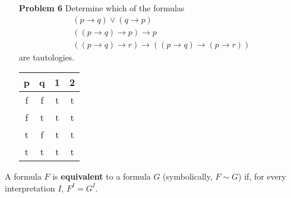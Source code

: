 \begin{enumerate}
\item[\textbf{Problem 6}] Determine which of the formulas 
\begin{gather*}
(p \rightarrow q) \vee  (q \rightarrow p) \\
((p \rightarrow q) \rightarrow  p) \rightarrow p \\
((p \rightarrow q) \rightarrow r) \rightarrow  ((p \rightarrow q) \rightarrow (p \rightarrow r ))  
\end{gather*}
are tautologies.     
\begin{table}[H]
\begin{center}
    \begin{tabular}{c c c c}
    \hline
    p & q & 1 & 2 \\ \hline
    f & f & t   & t   \\
    f & t & t   & t   \\
    t & f & t   & t   \\
    t & t & t   & t   \\ \hline
    \end{tabular}
\end{center}
\end{table}
\end{enumerate}

\noindent A formula $F$ is \textbf{equivalent} to a formula $G$ (symbolically, $F \sim G$) if, for every interpretation $I$, $F^I = G^I$. 

